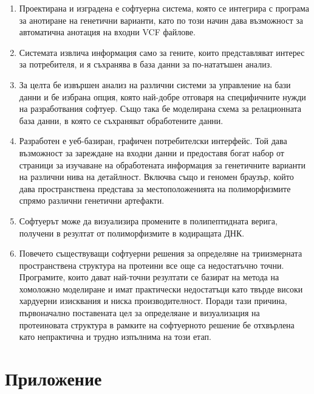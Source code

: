 \documentclass[pdftex,cyrillic,14pt,a4page,twoside,openright]{extreport}
\begin{document}
\begin{enumerate}
	\item Проектирана и изградена е софтуерна система, която се интегрира с програма за анотиране на генетични варианти, като по този начин дава възможност за автоматична анотация на входни VCF файлове.
	\item Системата извлича информация само за гените, които представляват интерес за потребителя, и я съхранява в база данни за по-нататъшен анализ.
	\item За целта бе извършен анализ на различни системи за управление на бази данни и бе избрана опция, която най-добре отговаря на специфичните нужди на разработвания софтуер. Също така бе моделирана схема за релационната база данни, в която се съхраняват обработените данни.
	\item Разработен е уеб-базиран, графичен потребителски интерфейс. Той дава възможност за зареждане на входни данни и предоставя богат набор от страници за изучаване на обработената информация за генетичните варианти на различни нива на детайлност. Включва също и геномен браузър, който дава пространствена представа за местоположенията на полиморфизмите спрямо различни генетични артефакти.
	\item Софтуерът може да визуализира промените в полипептидната верига, получени в резултат от полиморфизмите в кодиращата ДНК.
	\item Повечето съществуващи софтуерни решения за определяне на триизмерната пространствена структура на протеини все още са недостатъчно точни. Програмите, които дават най-точни резултати се базират на метода на хомоложно моделиране и имат практически недостатъци като твърде високи хардуерни изисквания и ниска производителност. Поради тази причина, първоначално поставената цел за определяане и визуализация на протеиновата структура в рамките на софтуерното решение бе отхвърлена като непрактична и трудно изпълнима на този етап.
\end{enumerate}


\cleardoublepage
{}
{}




\cleardoublepage
\chapter*{Приложение}
{}
\end{document}
